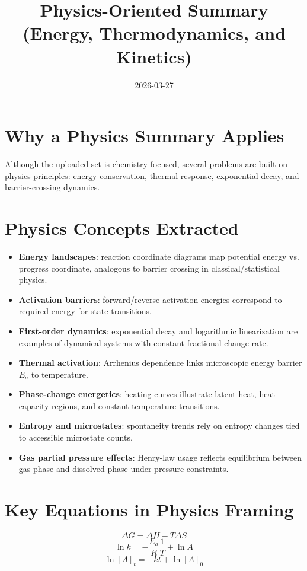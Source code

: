 \documentclass[11pt]{article}
\title{Physics-Oriented Summary (Energy, Thermodynamics, and Kinetics)}
\date{2026-03-27}
\begin{document}
\maketitle

\section*{Why a Physics Summary Applies}
Although the uploaded set is chemistry-focused, several problems are built on physics principles: energy conservation, thermal response, exponential decay, and barrier-crossing dynamics.

\section*{Physics Concepts Extracted}
\begin{itemize}[leftmargin=*]
  \item \textbf{Energy landscapes}: reaction coordinate diagrams map potential energy vs. progress coordinate, analogous to barrier crossing in classical/statistical physics.
  \item \textbf{Activation barriers}: forward/reverse activation energies correspond to required energy for state transitions.
  \item \textbf{First-order dynamics}: exponential decay and logarithmic linearization are examples of dynamical systems with constant fractional change rate.
  \item \textbf{Thermal activation}: Arrhenius dependence links microscopic energy barrier $E_a$ to temperature.
  \item \textbf{Phase-change energetics}: heating curves illustrate latent heat, heat capacity regions, and constant-temperature transitions.
  \item \textbf{Entropy and microstates}: spontaneity trends rely on entropy changes tied to accessible microstate counts.
  \item \textbf{Gas partial pressure effects}: Henry-law usage reflects equilibrium between gas phase and dissolved phase under pressure constraints.
\end{itemize}

\section*{Key Equations in Physics Framing}
\[
\Delta G = \Delta H - T\Delta S
\]
\[
\ln k = -\frac{E_a}{R}\frac{1}{T} + \ln A
\]
\[
\ln [A]_t = -kt + \ln [A]_0
\]
\end{document}
